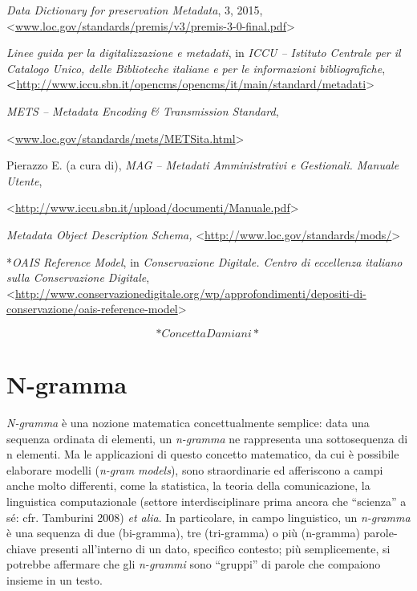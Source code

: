\documentclass[
  b5paper,
  twoside,
  11pt,
  chapterprefix=false,
  bibliography=totocnumbered,
  parskip=0]{scrbook}
\begin{document}
\emph{Data Dictionary for preservation Metadata}, 3, 2015,
\textless{}{\href{http://www.loc.gov/standards/premis/v3/premis-3-0-final.pdf}{www.loc.gov/standards/premis/v3/premis-3-0-final.pdf}\textgreater{}}

\emph{Linee guida per la digitalizzazione e metadati}, in \emph{ICCU -- Istituto
Centrale per il Catalogo Unico, delle Biblioteche italiane e per le
informazioni bibliografiche},
\textbf{\textless{}}{\url{http://www.iccu.sbn.it/opencms/opencms/it/main/standard/metadati}\textgreater{}}

\emph{METS -- Metadata Encoding \& Transmission Standard},

\textless{}\href{http://www.loc.gov/standards/mets/METSita.html}{{www.loc.gov/standards/mets/METSita.html}}\textgreater{}

Pierazzo E. (a cura di), \emph{MAG -- Metadati Amministrativi e Gestionali.
Manuale Utente},

\textless{}{\url{http://www.iccu.sbn.it/upload/documenti/Manuale.pdf}\textgreater{}}

\emph{Metadata Object Description Schema,}
\textless{}\href{http://www.loc.gov/standards/mods/}{{http://www.loc.gov/standards/mods/}}\textgreater{}

*\emph{OAIS Reference Model}, in \emph{Conservazione Digitale. Centro di
eccellenza italiano sulla Conservazione Digitale},
\textless{}{\url{http://www.conservazionedigitale.org/wp/approfondimenti/depositi-di-conservazione/oais-reference-model}\textgreater{}}

\[*Concetta Damiani*\]

\hypertarget{n-gramma}{%
\chapter{N-gramma}\label{n-gramma}}

\emph{N-gramma} è una nozione matematica concettualmente semplice: data una
sequenza ordinata di elementi, un \emph{n-gramma} ne rappresenta una
sottosequenza di n elementi. Ma le applicazioni di questo concetto
matematico, da cui è possibile elaborare modelli (\emph{n-gram models}), sono
straordinarie ed afferiscono a campi anche molto differenti, come la
statistica, la teoria della comunicazione, la linguistica computazionale
(settore interdisciplinare prima ancora che \enquote{scienza} a sé: cfr.
Tamburini 2008) \emph{et alia}. In particolare, in campo linguistico, un
\emph{n-gramma} è una sequenza di due (bi-gramma), tre (tri-gramma) o più
(n-gramma) parole-chiave presenti all'interno di un dato, specifico
contesto; più semplicemente, si potrebbe affermare che gli \emph{n-grammi}
sono \enquote{gruppi} di parole che compaiono insieme in un testo.
\end{document}
